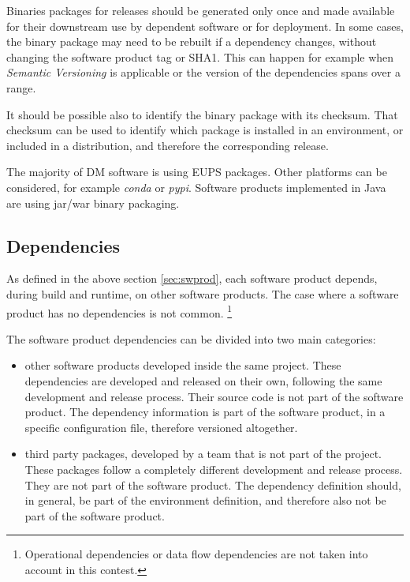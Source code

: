 Binaries packages for releases should be generated only once and made available for their downstream use by dependent software or for deployment.
In some cases, the binary package may need to be rebuilt if a dependency changes, without changing the software product tag or SHA1.
This can happen for example when \textit{Semantic Versioning} is applicable or the version of the dependencies spans over a range.

It should be possible also to identify the binary package with its checksum.
That checksum can be used to identify which package is installed in an environment, or included in a distribution, and therefore the corresponding release.

The majority of DM software is using EUPS packages. Other platforms can be considered, for example \textit{conda} or \textit{pypi}.
Software products implemented in Java are using jar/war binary packaging.


\subsection{Dependencies} \label{sec:dependencies}

As defined in the above section \ref{sec:swprod}, each software product depends, during build and runtime, on other software products.
The case where a software product has no dependencies is not common.
\footnote{Operational dependencies or data flow dependencies are not taken into account in this contest.}

The software product dependencies can be divided into two main categories:

\begin{itemize}
\item other software products developed inside the same project.
These dependencies are developed and released on their own, following the same development and release process.
Their source code is not part of the software product.
The dependency information is part of the software product, in a specific configuration file, therefore versioned altogether.
\item third party packages, developed by a team that is not part of the project.
These packages follow a completely different development and release process.
They are not part of the software product.
The dependency definition should, in general, be part of the environment definition, and therefore also not be part of the software product.
\end{itemize}

